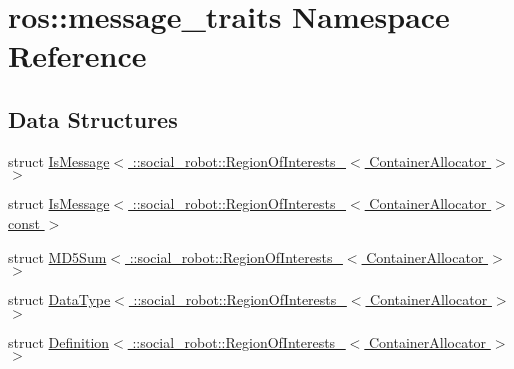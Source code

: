 \hypertarget{namespaceros_1_1message__traits}{
\section{ros::message\_\-traits Namespace Reference}
\label{namespaceros_1_1message__traits}
}
\subsection*{Data Structures}
\begin{DoxyCompactItemize}
\item 
struct \hyperlink{structros_1_1message__traits_1_1IsMessage_3_01_1_1social__robot_1_1RegionOfInterests___3_01ContainerAllocator_01_4_01_4}{IsMessage$<$ ::social\_\-robot::RegionOfInterests\_\-$<$ ContainerAllocator $>$ $>$}
\item 
struct \hyperlink{structros_1_1message__traits_1_1IsMessage_3_01_1_1social__robot_1_1RegionOfInterests___3_01ContainerAllocator_01_4const_01_01_4}{IsMessage$<$ ::social\_\-robot::RegionOfInterests\_\-$<$ ContainerAllocator $>$const  $>$}
\item 
struct \hyperlink{structros_1_1message__traits_1_1MD5Sum_3_01_1_1social__robot_1_1RegionOfInterests___3_01ContainerAllocator_01_4_01_4}{MD5Sum$<$ ::social\_\-robot::RegionOfInterests\_\-$<$ ContainerAllocator $>$ $>$}
\item 
struct \hyperlink{structros_1_1message__traits_1_1DataType_3_01_1_1social__robot_1_1RegionOfInterests___3_01ContainerAllocator_01_4_01_4}{DataType$<$ ::social\_\-robot::RegionOfInterests\_\-$<$ ContainerAllocator $>$ $>$}
\item 
struct \hyperlink{structros_1_1message__traits_1_1Definition_3_01_1_1social__robot_1_1RegionOfInterests___3_01ContainerAllocator_01_4_01_4}{Definition$<$ ::social\_\-robot::RegionOfInterests\_\-$<$ ContainerAllocator $>$ $>$}
\end{DoxyCompactItemize}
